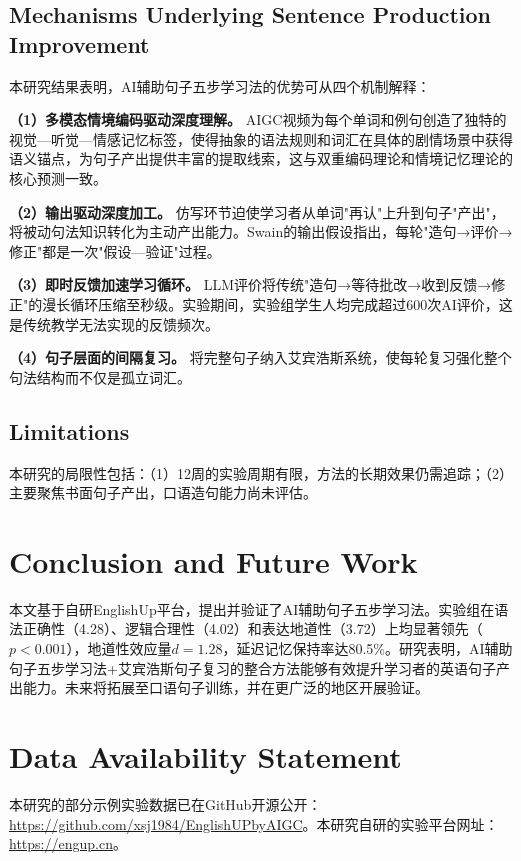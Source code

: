 \documentclass[12pt,a4paper]{ctexart}
\begin{document}
\subsection{Mechanisms Underlying Sentence Production Improvement}
本研究结果表明，AI辅助句子五步学习法的优势可从四个机制解释：

\textbf{（1）多模态情境编码驱动深度理解。} AIGC视频为每个单词和例句创造了独特的视觉—听觉—情感记忆标签，使得抽象的语法规则和词汇在具体的剧情场景中获得语义锚点，为句子产出提供丰富的提取线索，这与双重编码理论\cite{paivio1991dual}和情境记忆理论\cite{tulving1983elements}的核心预测一致。

\textbf{（2）输出驱动深度加工。} 仿写环节迫使学习者从单词"再认"上升到句子"产出"，将被动句法知识转化为主动产出能力。Swain的输出假设指出，每轮"造句→评价→修正"都是一次"假设—验证"过程\cite{swain1995three}。

\textbf{（3）即时反馈加速学习循环。} LLM评价将传统"造句→等待批改→收到反馈→修正"的漫长循环压缩至秒级。实验期间，实验组学生人均完成超过600次AI评价，这是传统教学无法实现的反馈频次。

\textbf{（4）句子层面的间隔复习。} 将完整句子纳入艾宾浩斯系统，使每轮复习强化整个句法结构而不仅是孤立词汇。

\subsection{Limitations}
本研究的局限性包括：（1）12周的实验周期有限，方法的长期效果仍需追踪；（2）主要聚焦书面句子产出，口语造句能力尚未评估。


\section{Conclusion and Future Work}  %

本文基于自研EnglishUp平台，提出并验证了AI辅助句子五步学习法。实验组在语法正确性（4.28）、逻辑合理性（4.02）和表达地道性（3.72）上均显著领先（$p<0.001$），地道性效应量$d=1.28$，延迟记忆保持率达80.5\%。研究表明，AI辅助句子五步学习法+艾宾浩斯句子复习的整合方法能够有效提升学习者的英语句子产出能力。未来将拓展至口语句子训练，并在更广泛的地区开展验证。


\section*{Data Availability Statement}
本研究的部分示例实验数据已在GitHub开源公开：\url{https://github.com/xsj1984/EnglishUPbyAIGC}。本研究自研的实验平台网址：\url{https://engup.cn}。
\end{document}
